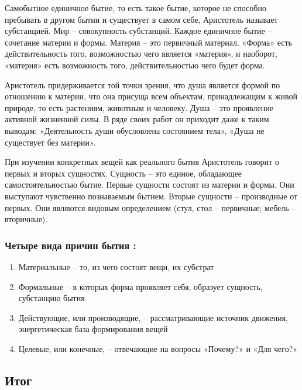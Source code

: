 \documentclass[
]{article}
\providecommand{\tightlist}{%
  \setlength{\itemsep}{0pt}\setlength{\parskip}{0pt}}
\begin{document}
Самобытное единичное бытие, то есть такое бытие, которое не способно
пребывать в другом бытии и существует в самом себе, Аристотель называет
субстанцией. Мир -- совокупность субстанций. Каждое единичное бытие --
сочетание материи и формы. Материя -- это первичный материал. «Форма»
есть действительность того, возможностью чего является «материя», и
наоборот, «материя» есть возможность того, действительностью чего будет
форма.

Аристотель придерживается той точки зрения, что душа является формой по
отношению к материи, что она присуща всем объектам, принадлежащим к
живой природе, то есть растениям, животным и человеку. Душа -- это
проявление активной жизненной силы. В ряде своих работ он приходит даже
к таким выводам: «Деятельность души обусловлена состоянием тела», «Душа
не существует без материи».

При изучении конкретных вещей как реального бытия Аристотель говорит о
первых и вторых сущностях. Сущность -- это единое, обладающее
самостоятельностью бытие. Первые сущности состоят из материи и формы.
Они выступают чувственно познаваемым бытием. Вторые сущности --
производные от первых. Они являются видовым определением (стул, стол --
первичные; мебель -- вторичные).

\hypertarget{ux447ux435ux442ux44bux440ux435-ux432ux438ux434ux430-ux43fux440ux438ux447ux438ux43d-ux431ux44bux442ux438ux44f}{%
\subsubsection{Четыре вида причин бытия
:}\label{ux447ux435ux442ux44bux440ux435-ux432ux438ux434ux430-ux43fux440ux438ux447ux438ux43d-ux431ux44bux442ux438ux44f}}

\begin{enumerate}
\def\labelenumi{\arabic{enumi}.}
\tightlist
\item
  Материальные -- то, из чего состоят вещи, их субстрат
\item
  Формальные -- в которых форма проявляет себя, образует сущность,
  субстанцию бытия
\item
  Действующие, или производящие, -- рассматривающие источник движения,
  энергетическая база формирования вещей
\item
  Целевые, или конечные, -- отвечающие на вопросы «Почему?» и «Для
  чего?»
\end{enumerate}

\hypertarget{ux438ux442ux43eux433-3}{%
\subsection{Итог}\label{ux438ux442ux43eux433-3}}
\end{document}
